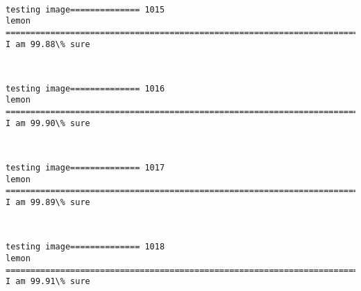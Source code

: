 \documentclass[11pt]{article}
\begin{document}
    \begin{center}
    \end{center}
    { \hspace*{\fill} \\}
    
    \begin{Verbatim}[commandchars=\\\{\}]
testing image============== 1015
lemon
============================================================================
I am 99.88\% sure

    \end{Verbatim}

    \begin{center}
    \end{center}
    { \hspace*{\fill} \\}
    
    \begin{Verbatim}[commandchars=\\\{\}]
testing image============== 1016
lemon
============================================================================
I am 99.90\% sure

    \end{Verbatim}

    \begin{center}
    \end{center}
    { \hspace*{\fill} \\}
    
    \begin{Verbatim}[commandchars=\\\{\}]
testing image============== 1017
lemon
============================================================================
I am 99.89\% sure

    \end{Verbatim}

    \begin{center}
    \end{center}
    { \hspace*{\fill} \\}
    
    \begin{Verbatim}[commandchars=\\\{\}]
testing image============== 1018
lemon
============================================================================
I am 99.91\% sure

    \end{Verbatim}
\end{document}

